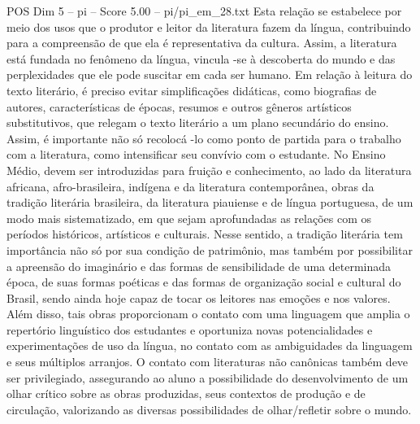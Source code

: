 \begin{textsample}{POS Dim 5 – pi – Score 5.00 – pi/pi\_em\_28.txt}
Esta relação se estabelece por meio dos usos que o produtor e leitor da literatura fazem da língua, contribuindo para a compreensão de que ela é representativa da cultura.
Assim, a literatura está fundada no fenômeno da língua, vincula -se à descoberta do mundo e das perplexidades que ele pode suscitar em cada ser humano.
Em relação à leitura do texto literário, é preciso evitar simplificações didáticas, como biografias de autores, características de épocas, resumos e outros gêneros artísticos substitutivos, que relegam o texto literário a um plano secundário do ensino.
Assim, é importante não só recolocá -lo como ponto de partida para o trabalho com a literatura, como intensificar seu convívio com o estudante.
No Ensino Médio, devem ser introduzidas para fruição e conhecimento, ao lado da literatura africana, afro-brasileira, indígena e da literatura contemporânea, obras da tradição literária brasileira, da literatura piauiense e de língua portuguesa, de um modo mais sistematizado, em que sejam aprofundadas as relações com os períodos históricos, artísticos e culturais.
Nesse sentido, a tradição literária tem importância não só por sua condição de patrimônio, mas também por possibilitar a apreensão do imaginário e das formas de sensibilidade de uma determinada época, de suas formas poéticas e das formas de organização social e cultural do Brasil, sendo ainda hoje capaz de tocar os leitores nas emoções e nos valores.
Além disso, tais obras proporcionam o contato com uma linguagem que amplia o repertório linguístico dos estudantes e oportuniza novas potencialidades e experimentações de uso da língua, no contato com as ambiguidades da linguagem e seus múltiplos arranjos.
O contato com literaturas não canônicas também deve ser privilegiado, assegurando ao aluno a possibilidade do desenvolvimento de um olhar crítico sobre as obras produzidas, seus contextos de produção e de circulação, valorizando as diversas possibilidades de olhar/refletir sobre o mundo.

\end{textsample}
